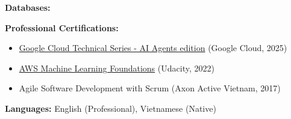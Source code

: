 \documentclass[10pt,a4paper,ragged2e,withhyper]{altacv}
\begin{document}
\smallskip
\textbf{Databases:}       

\medskip


\textbf{Professional Certifications:}
\begin{itemize}[leftmargin=*,noitemsep,topsep=0pt]
    \item \href{https://www.credential.net/f16b9afc-1d7a-4427-b7e3-f0bf76cd75ae}{Google Cloud Technical Series - AI Agents edition} (Google Cloud, 2025)
    \item \href{https://s3-us-west-2.amazonaws.com/udacity-printer/production/certificates/0ad10fbf-13db-4f96-b196-a108e3bff2b2.pdf}{AWS Machine Learning Foundations} (Udacity, 2022)
    \item Agile Software Development with Scrum (Axon Active Vietnam, 2017)
\end{itemize}

\smallskip
\textbf{Languages:} English (Professional), Vietnamese (Native)
\end{document}
